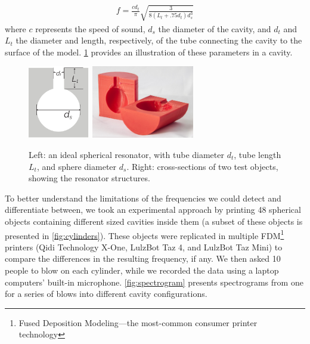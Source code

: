         \begin{align}\label{eq:hhz}
          f = \frac{cd_t}{\pi}\sqrt{\frac{3}{8(L_t+.75 d_t)d_s^3}}
        \end{align}
        where $c$ represents the speed of sound, $d_s$ the diameter of the
        cavity, and $d_t$ and $L_t$ the diameter and length, respectively, of
        the tube connecting the cavity to the surface of the model.
        \cref{fig:resonator} provides an illustration of these parameters in a
        \bh cavity.
        
        \begin{figure}[H]
          \centering
            \includegraphics[height=1.25in]{figures/helmholtz_illustration}
            \quad
            \includegraphics[height=1.25in]{figures/cavities2}
            \caption{Left: an ideal spherical \hhz resonator, with tube diameter
            $d_t$, tube length $L_t$, and sphere diameter $d_s$. Right:
            cross-sections of two \bh test objects, showing the resonator
            structures.}
            \label{fig:resonator}
        \end{figure}
                            
            To better understand the limitations of the frequencies we could
            detect and differentiate between, we took an experimental approach
            by printing 48 spherical objects containing different sized cavities inside
            them (a subset of these objects is presented in
            \cref{fig:cylinders}).  These objects were replicated in multiple
            FDM\footnote{Fused Deposition Modeling---the most-common consumer
            printer technology} printers (Qidi Technology X-One, LulzBot Taz 4,
            and LulzBot Taz Mini) to compare the differences in the resulting
            frequency, if any. We then asked 10 people to blow on each
            cylinder, while we recorded the data using a laptop computers'
            built-in microphone.  \cref{fig:spectrogram} presents spectrograms
            from one for a series of blows into different cavity
            configurations.
        
